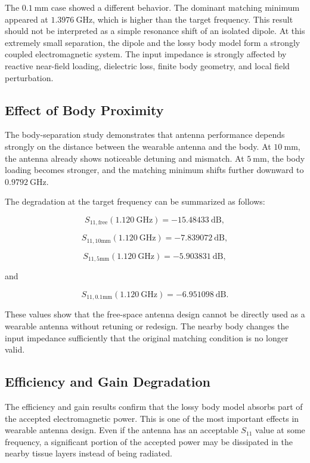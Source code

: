 The \(0.1~\mathrm{mm}\) case showed a different behavior. The dominant matching minimum appeared at \(1.3976~\mathrm{GHz}\), which is higher than the target frequency. This result should not be interpreted as a simple resonance shift of an isolated dipole. At this extremely small separation, the dipole and the lossy body model form a strongly coupled electromagnetic system. The input impedance is strongly affected by reactive near-field loading, dielectric loss, finite body geometry, and local field perturbation.

\subsection{Effect of Body Proximity}

The body-separation study demonstrates that antenna performance depends strongly on the distance between the wearable antenna and the body. At \(10~\mathrm{mm}\), the antenna already shows noticeable detuning and mismatch. At \(5~\mathrm{mm}\), the body loading becomes stronger, and the matching minimum shifts further downward to \(0.9792~\mathrm{GHz}\).

The degradation at the target frequency can be summarized as follows:

\[
S_{11,\mathrm{free}}(1.120~\mathrm{GHz}) = -15.48433~\mathrm{dB},
\]

\[
S_{11,\mathrm{10mm}}(1.120~\mathrm{GHz}) = -7.839072~\mathrm{dB},
\]

\[
S_{11,\mathrm{5mm}}(1.120~\mathrm{GHz}) = -5.903831~\mathrm{dB},
\]

and

\[
S_{11,\mathrm{0.1mm}}(1.120~\mathrm{GHz}) = -6.951098~\mathrm{dB}.
\]

These values show that the free-space antenna design cannot be directly used as a wearable antenna without retuning or redesign. The nearby body changes the input impedance sufficiently that the original matching condition is no longer valid.

\subsection{Efficiency and Gain Degradation}

The efficiency and gain results confirm that the lossy body model absorbs part of the accepted electromagnetic power. This is one of the most important effects in wearable antenna design. Even if the antenna has an acceptable \(S_{11}\) value at some frequency, a significant portion of the accepted power may be dissipated in the nearby tissue layers instead of being radiated.

